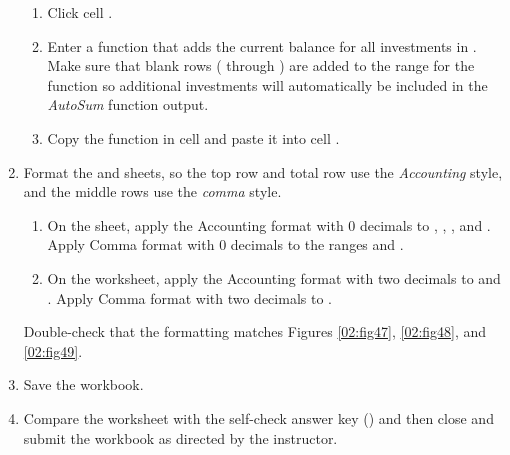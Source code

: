 \begin{enumbox}
\begin{enumerate}
\begin{enumerate}
			\item Click cell . 
			
			\item Enter a  function that adds the current balance for all investments in . Make sure that blank rows ( through ) are added to the range for the function so additional investments will automatically be included in the \textit{AutoSum} function output.
			
			\item Copy the  function in cell  and paste it into cell .
		\end{enumerate}
		
		\item Format the  and  sheets, so the top row and total row use the \textit{Accounting} style, and the middle rows use the \textit{comma} style. 
		
		\begin{enumerate}
			\item On the  sheet, apply the Accounting format with $ 0 $ decimals to , , , and . Apply Comma format with $ 0 $ decimals to the ranges  and . 
	
			\item On the  worksheet, apply the Accounting format with two decimals to  and . Apply Comma format with two decimals to . 
		\end{enumerate}
		
		Double-check that the formatting matches Figures \ref{02:fig47}, \ref{02:fig48}, and \ref{02:fig49}.

		\item Save the  workbook.

		\item Compare the worksheet with the self-check answer key () and then close and submit the  workbook as directed by the instructor.
	
	\end{enumerate}
\end{enumbox}

